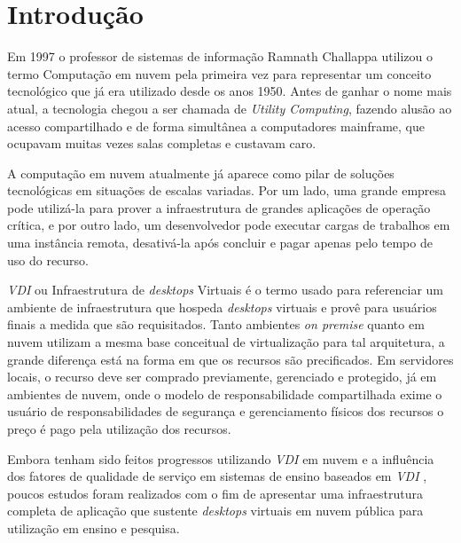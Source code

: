 
\chapter{Introdução}\label{cap:introducao}

Em 1997 o professor de sistemas de informação Ramnath Challappa utilizou o termo Computação em nuvem pela primeira vez para representar um conceito tecnológico que já era utilizado desde os anos 1950. Antes de ganhar o nome mais atual, a tecnologia chegou a ser chamada de \textit{Utility Computing}, fazendo alusão ao acesso compartilhado e de forma simultânea a computadores mainframe, que ocupavam muitas vezes salas completas e custavam caro. \citep{dellcloud}

A computação em nuvem atualmente já aparece como pilar de soluções tecnológicas em situações de escalas variadas. Por um lado, uma grande empresa pode utilizá-la para prover a infraestrutura de grandes aplicações de operação crítica, e por outro lado, um desenvolvedor pode executar cargas de trabalhos em uma instância remota, desativá-la após concluir e pagar apenas pelo tempo de uso do recurso. \citep{taurioncloud}

\textit{VDI} ou Infraestrutura de \textit{desktops} Virtuais é o termo usado para referenciar um ambiente de infraestrutura que hospeda \textit{desktops} virtuais e provê para usuários finais a medida que são requisitados. Tanto ambientes \textit{on premise} quanto em nuvem utilizam a mesma base conceitual de virtualização para tal arquitetura, a grande diferença está na forma em que os recursos são precificados. Em servidores locais, o recurso deve ser comprado previamente, gerenciado e protegido, já em ambientes de nuvem, onde o modelo de responsabilidade compartilhada exime o usuário de responsabilidades de segurança e gerenciamento físicos dos recursos o preço é pago pela utilização dos recursos. \citep{vmwarevdi}

Embora tenham sido feitos progressos utilizando \textit{VDI} em nuvem e a influência dos fatores de qualidade de serviço em sistemas de ensino baseados em \textit{VDI} \citep{qoselearning}, poucos estudos foram realizados com o fim de apresentar uma infraestrutura completa de aplicação que sustente \textit{desktops} virtuais em nuvem pública para utilização em ensino e pesquisa.

